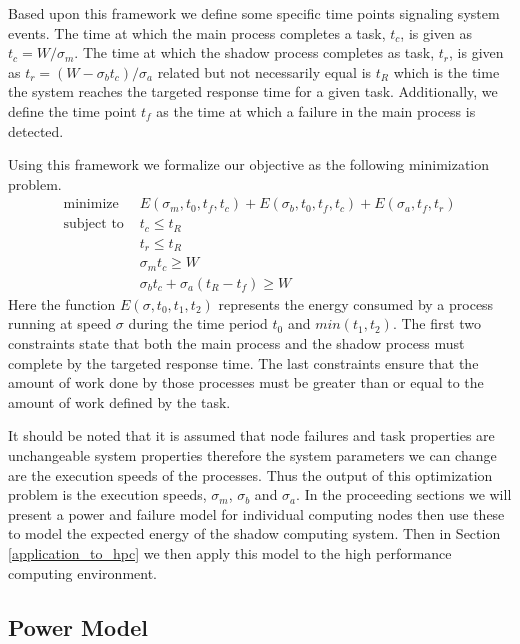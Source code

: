 Based upon this framework we define some specific time points
signaling system events. The time at which the main process completes
a task, $t_c$, is given as $t_c=W/\sigma_m$. The time at which the
shadow process completes as task, $t_r$, is given as $t_r =(W-\sigma_b
t_c)/\sigma_a$ related but not necessarily equal is $t_R$ which is the
time the system reaches the targeted response time for a given
task. Additionally, we define the time point $t_f$ as the time at which
a failure in the main process is detected.

Using this framework we formalize our objective as the following
minimization problem.
\begin{equation}
\label{optimization_problem}
\begin{split}
\text{minimize  }   & E(\sigma_m,t_0,t_f,t_c) + E(\sigma_b,t_0,t_f,t_c) + E(\sigma_a,t_f,t_r) \\
\text{subject to  } & t_c \leq t_R \\
                  & t_r \leq t_R \\
                  & \sigma_m t_c \geq W \\
                  & \sigma_b t_c + \sigma_a (t_R - t_f) \geq W
\end{split}
\end{equation}
Here the function $E(\sigma,t_0,t_1,t_2)$ represents the energy
consumed by a process running at speed $\sigma$ during the time period
$t_0$ and $min(t_1,t_2)$. The first two constraints state that both
the main process and the shadow process must complete by the targeted
response time. The last constraints ensure that the amount of work
done by those processes must be greater than or equal to the amount of
work defined by the task.

It should be noted that it is assumed that node failures and task
properties are unchangeable system properties therefore the system
parameters we can change are the execution speeds of the
processes. Thus the output of this optimization problem is the
execution speeds, $\sigma_m$, $\sigma_b$ and $\sigma_a$. In the
proceeding sections we will present a power and failure model for
individual computing nodes then use these to model the expected energy
of the shadow computing system. Then in Section
\ref{application_to_hpc} we then apply this model to the high
performance computing environment.

\subsection{Power Model}
\label{power_model}

